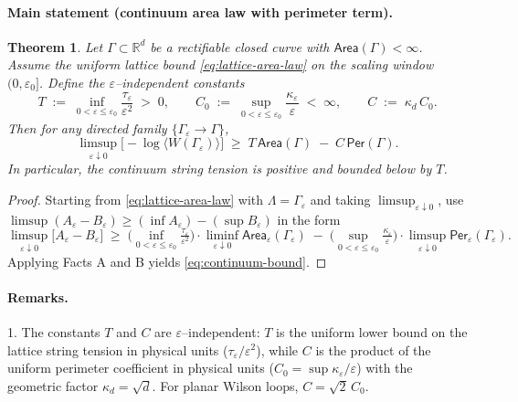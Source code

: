 \documentclass[11pt]{amsart}
\theoremstyle{plain}
\newtheorem{theorem}{Theorem}[section]
\theoremstyle{definition}
\theoremstyle{remark}
\begin{document}
\paragraph{Main statement (continuum area law with perimeter term).}
\begin{theorem}
Let $\Gamma\subset\mathbb{R}^d$ be a rectifiable closed curve with $\mathsf{Area}(\Gamma)<\infty$. Assume the uniform lattice bound \eqref{eq:lattice-area-law} on the scaling window $(0,\varepsilon_0]$. Define the $\varepsilon$--independent constants
\[
  T\;:=\;\inf_{0<\varepsilon\le\varepsilon_0}\frac{\tau_\varepsilon}{\varepsilon^2}\;>\;0,\qquad
  C_0\;:=\;\sup_{0<\varepsilon\le\varepsilon_0}\frac{\kappa_\varepsilon}{\varepsilon}\;<\;\infty,\qquad
  C\;:=\;\kappa_d\,C_0.
\]
Then for any directed family $\{\Gamma_\varepsilon\to\Gamma\}$,
\begin{equation}
\label{eq:continuum-bound}
  \limsup_{\varepsilon\downarrow 0}\bigl[-\log\langle W(\Gamma_\varepsilon)\rangle\bigr]
  \;\ge\;
  T\,\mathsf{Area}(\Gamma)\;-
  \;C\,\mathsf{Per}(\Gamma).
\end{equation}
In particular, the continuum string tension is positive and bounded below by $T$.
\end{theorem}

\begin{proof}
Starting from \eqref{eq:lattice-area-law} with $\Lambda=\Gamma_\varepsilon$ and taking $\limsup_{\varepsilon\downarrow 0}$, use $\limsup(A_\varepsilon-B_\varepsilon)\ge (\inf A_\varepsilon)-(\sup B_\varepsilon)$ in the form
\[
  \limsup_{\varepsilon\downarrow 0}\bigl[A_\varepsilon-B_\varepsilon\bigr]
  \;\ge\;
  \Big(\inf_{0<\varepsilon\le\varepsilon_0}\tfrac{\tau_\varepsilon}{\varepsilon^2}\Big)\cdot
  \liminf_{\varepsilon\downarrow 0}\mathsf{Area}_\varepsilon(\Gamma_\varepsilon)
  \;-
  \;\Big(\sup_{0<\varepsilon\le\varepsilon_0}\tfrac{\kappa_\varepsilon}{\varepsilon}\Big)\cdot
  \limsup_{\varepsilon\downarrow 0}\mathsf{Per}_\varepsilon(\Gamma_\varepsilon).
\]
Applying Facts A and B yields \eqref{eq:continuum-bound}.
\end{proof}

\paragraph{Remarks.}
1. The constants $T$ and $C$ are $\varepsilon$--independent: $T$ is the uniform lower bound on the lattice string tension in physical units ($\tau_\varepsilon/\varepsilon^2$), while $C$ is the product of the uniform perimeter coefficient in physical units ($C_0=\sup\kappa_\varepsilon/\varepsilon$) with the geometric factor $\kappa_d=\sqrt{d}$. For planar Wilson loops, $C=\sqrt{2}\,C_0$.
\end{document}
